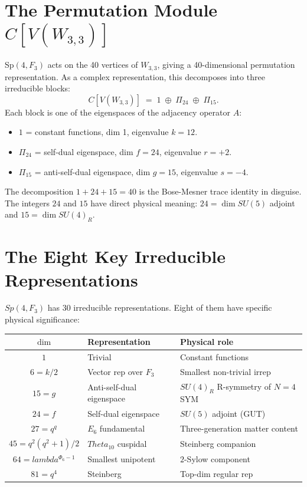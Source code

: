 \documentclass[12pt,a4paper]{article}
\def\mathbb#1{#1}%
\def\mathrm#1{#1}%
\def\mathbf#1{#1}%
\def\mathcal#1{#1}%
\def\lambda{lambda}%
\def\Phi#1{Phi#1}%
\def\Theta{Theta}%
\theoremstyle{definition}
\newcommand{\Sp}{\mathrm{Sp}}
\newcommand{\SU}{\mathrm{SU}}
\newcommand{\FF}{\mathbb{F}}
\newcommand{\CC}{\mathbb{C}}
\begin{document}
\section*{The Permutation Module $\CC[V(W_{3,3})]$}

Sp$(4, \FF_3)$ acts on the 40 vertices of $W_{3,3}$, giving a
40-dimensional permutation representation. As a complex
representation, this decomposes into three irreducible blocks:
\[
\boxed{\;\CC[V(W_{3,3})] \;=\; \mathbf{1} \;\oplus\; \Pi_{24} \;\oplus\; \Pi_{15}.\;}
\]
Each block is one of the eigenspaces of the adjacency operator
$A$:
\begin{itemize}[leftmargin=2em,nosep]
\item $\mathbf{1}$ = constant functions, dim 1, eigenvalue $k = 12$.
\item $\Pi_{24}$ = self-dual eigenspace, dim $f = 24$, eigenvalue $r = +2$.
\item $\Pi_{15}$ = anti-self-dual eigenspace, dim $g = 15$, eigenvalue $s = -4$.
\end{itemize}
The decomposition $1 + 24 + 15 = 40$ is the Bose-Mesner trace
identity in disguise. The integers $24$ and $15$ have direct physical
meaning: $24 = \dim\SU(5)$ adjoint and $15 = \dim\SU(4)_R$.

\section*{The Eight Key Irreducible Representations}

$\Sp(4, \FF_3)$ has 30 irreducible representations. Eight of them
have specific physical significance:

\begin{center}
\renewcommand{\arraystretch}{1.4}
\begin{tabular}{cll}
\toprule
$\dim$ & Representation & Physical role \\
\midrule
$1$ & Trivial & Constant functions \\
$6 = k/2$ & Vector rep over $\FF_3$ & Smallest non-trivial irrep \\
$15 = g$ & Anti-self-dual eigenspace & $\SU(4)_R$ R-symmetry of $\mathcal{N}=4$ SYM \\
$24 = f$ & Self-dual eigenspace & $\SU(5)$ adjoint (GUT) \\
$27 = q^q$ & $E_6$ fundamental & Three-generation matter content \\
$45 = q^2(q^2{+}1)/2$ & $\Theta_{10}$ cuspidal & Steinberg companion \\
$64 = \lambda^{\Phi_6 - 1}$ & Smallest unipotent & $2$-Sylow component \\
$81 = q^4$ & Steinberg & Top-dim regular rep \\
\bottomrule
\end{tabular}
\end{center}
\end{document}
